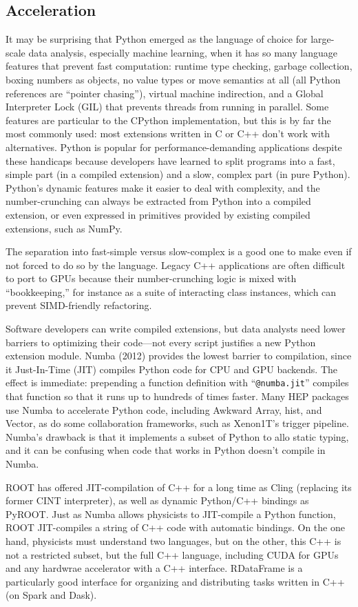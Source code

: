 \documentclass{article}
\begin{document}
\subsection{Acceleration}

It may be surprising that Python emerged as the language of choice for large-scale data analysis, especially machine learning, when it has so many language features that prevent fast computation: runtime type checking, garbage collection, boxing numbers as objects, no value types or move semantics at all (all Python references are ``pointer chasing''), virtual machine indirection, and a Global Interpreter Lock (GIL) that prevents threads from running in parallel. Some features are particular to the CPython implementation, but this is by far the most commonly used: most extensions written in C or C++ don't work with alternatives. Python is popular for performance-demanding applications despite these handicaps because developers have learned to split programs into a fast, simple part (in a compiled extension) and a slow, complex part (in pure Python). Python's dynamic features make it easier to deal with complexity, and the number-crunching can always be extracted from Python into a compiled extension, or even expressed in primitives provided by existing compiled extensions, such as NumPy.

The separation into fast-simple versus slow-complex is a good one to make even if not forced to do so by the language. Legacy C++ applications are often difficult to port to GPUs because their number-crunching logic is mixed with ``bookkeeping,'' for instance as a suite of interacting class instances, which can prevent SIMD-friendly refactoring.

Software developers can write compiled extensions, but data analysts need lower barriers to optimizing their code---not every script justifies a new Python extension module. Numba (2012) provides the lowest barrier to compilation, since it Just-In-Time (JIT) compiles Python code for CPU and GPU backends. The effect is immediate: prepending a function definition with ``{\tt @numba.jit}'' compiles that function so that it runs up to hundreds of times faster. Many HEP packages use Numba to accelerate Python code, including Awkward Array, hist, and Vector, as do some collaboration frameworks, such as Xenon1T's trigger pipeline. Numba's drawback is that it implements a subset of Python to allo static typing, and it can be confusing when code that works in Python doesn't compile in Numba.

ROOT has offered JIT-compilation of C++ for a long time as Cling (replacing its former CINT interpreter), as well as dynamic Python/C++ bindings as PyROOT. Just as Numba allows physicists to JIT-compile a Python function, ROOT JIT-compiles a string of C++ code with automatic bindings. On the one hand, physicists must understand two languages, but on the other, this C++ is not a restricted subset, but the full C++ language, including CUDA for GPUs and any hardwrae accelerator with a C++ interface. RDataFrame is a particularly good interface for organizing and distributing tasks written in C++ (on Spark and Dask).
\end{document}
